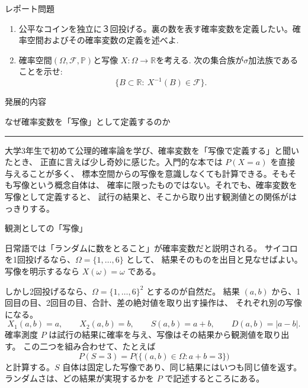 \documentclass[a4paper,10pt,pdflatex,ja=standard,jafont=ipaex-type1,
  magstyle=real,scale=1]{bxjsarticle}
\newcommand{\coursename}{確率論と統計学 I}
\newcommand{\topic}[1]{\par\vspace{5pt}
  {\large\sffamily\mdseries\color{accent}#1}\par\vspace{2pt}}
\begin{document}
\topic{レポート問題}
\begin{enumerate}[label=\arabic*.]
  \item 公平なコインを独立に３回投げる。裏の数を表す確率変数を定義したい。確率空間およびその確率変数の定義を述べよ.
  \item 確率空間$(\Omega,\mathcal F,\mathbb P)$と写像 $X:\Omega\to \mathbb R$を考える. 次の集合族が$\sigma$加法族であることを示せ:
$$\{B\subset \mathbb R:~X^{-1}(B) \in \mathcal F\}.$$
\end{enumerate}

\newpage
\begingroup
\setlength{\parskip}{2.5pt}
\newcommand{\columnheading}[1]{\par\vspace{5pt}
  {\fontsize{11pt}{15pt}\selectfont\sffamily\mdseries\color{accent}#1}\par\vspace{2pt}}
\fancyhead[L]{\small\color{ink}\coursename{}・発展的内容}

{\small\sffamily\mdseries\color{accent}発展的内容}\par
\vspace{4pt}
{\Large\color{ink}なぜ確率変数を「写像」として定義するのか}\par
\vspace{2pt}
{\color{accent}\rule{\linewidth}{0.7pt}}\par
\vspace{4pt}

大学3年生で初めて公理的確率論を学び、確率変数を「写像で定義する」と聞いたとき、
正直に言えば少し奇妙に感じた。入門的な本では $P(X=a)$ を直接与えることが多く、
標本空間からの写像を意識しなくても計算できる。そもそも写像という概念自体は、
確率に限ったものではない。それでも、確率変数を写像として定義すると、
試行の結果と、そこから取り出す観測値との関係がはっきりする。

\columnheading{観測としての「写像」}
日常語では「ランダムに数をとること」が確率変数だと説明される。
サイコロを1回投げるなら、$\Omega=\{1,\ldots,6\}$ として、
結果そのものを出目と見なせばよい。写像を明示するなら $X(\omega)=\omega$ である。

しかし2回投げるなら、$\Omega=\{1,\ldots,6\}^2$ とするのが自然だ。
結果 $(a,b)$ から、1回目の目、2回目の目、合計、差の絶対値を取り出す操作は、
それぞれ別の写像になる。
$$
  X_1(a,b)=a,\qquad X_2(a,b)=b,\qquad
  S(a,b)=a+b,\qquad D(a,b)=|a-b|.
$$
確率測度 $P$ は試行の結果に確率を与え、写像はその結果から観測値を取り出す。
この二つを組み合わせて、たとえば
$$
  P(S=3)=P\bigl(\{(a,b)\in\Omega:a+b=3\}\bigr)
$$
と計算する。$S$ 自体は固定した写像であり、同じ結果にはいつも同じ値を返す。
ランダムさは、どの結果が実現するかを $P$ で記述するところにある。
\end{document}

